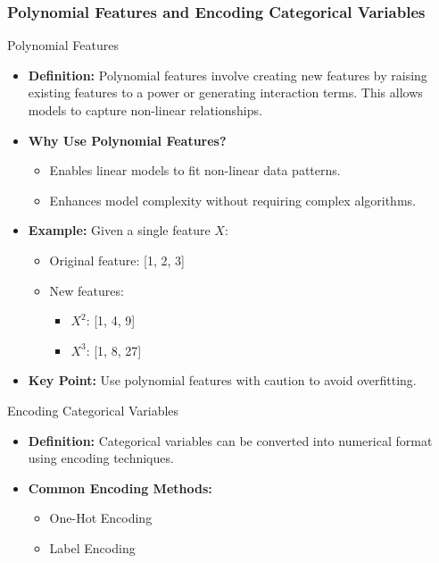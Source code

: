 \documentclass{beamer}
\begin{document}
\begin{frame}[fragile]
    \frametitle{Polynomial Features and Encoding Categorical Variables}

    \begin{block}{Polynomial Features}
        \begin{itemize}
            \item \textbf{Definition:} Polynomial features involve creating new features by raising existing features to a power or generating interaction terms. This allows models to capture non-linear relationships.
            \item \textbf{Why Use Polynomial Features?}
                \begin{itemize}
                    \item Enables linear models to fit non-linear data patterns.
                    \item Enhances model complexity without requiring complex algorithms.
                \end{itemize}
            \item \textbf{Example:} Given a single feature \(X\):
                \begin{itemize}
                    \item Original feature: [1, 2, 3]
                    \item New features:
                    \begin{itemize}
                        \item \(X^2\): [1, 4, 9]
                        \item \(X^3\): [1, 8, 27]
                    \end{itemize}
                \end{itemize}
            \item \textbf{Key Point:} Use polynomial features with caution to avoid overfitting.
        \end{itemize}
    \end{block}

    \begin{block}{Encoding Categorical Variables}
        \begin{itemize}
            \item \textbf{Definition:} Categorical variables can be converted into numerical format using encoding techniques.
            \item \textbf{Common Encoding Methods:}
                \begin{itemize}
                    \item One-Hot Encoding
                    \item Label Encoding
                \end{itemize}
        \end{itemize}
        

\end{block}
\end{frame}
\end{document}
